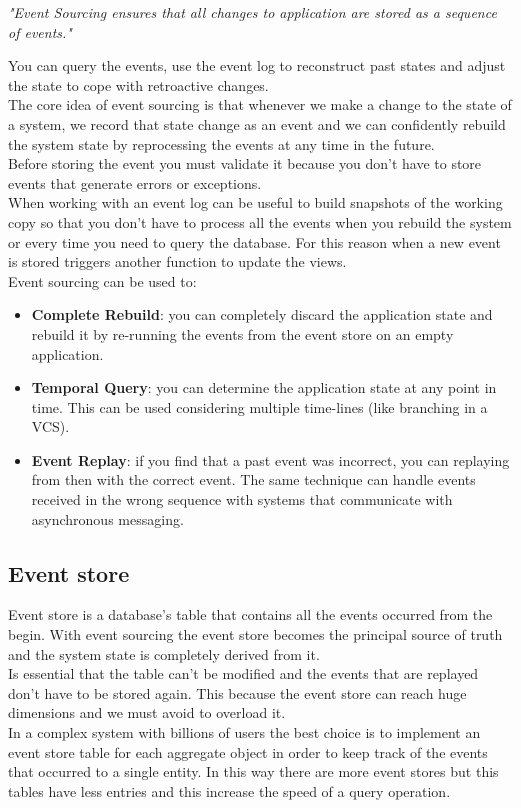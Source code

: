 \newpage
{}
\begin{center}
	\emph{"Event Sourcing ensures that all changes to application are stored as a sequence of events."} \\
\end{center}

You can query the events, use the event log to reconstruct past states and adjust the state to cope with retroactive changes.\\
The core idea of event sourcing is that whenever we make a change to the state of a system, we record that state change as an event and we can confidently rebuild the system state by reprocessing the events at any time in the future.\\
Before storing the event you must validate it because you don't have to store events that generate errors or exceptions.\\ 
When working with an event log can be useful to build snapshots of the working copy so that you don't have to process all the events when you rebuild the system or every time you need to query the database. For this reason when a new event is stored triggers another function to update the views.\\
Event sourcing can be used to:
\begin{itemize}
	\item \textbf{Complete Rebuild}: you can completely discard the application state  and rebuild it by re-running the events from the event store on an empty application.
	\item \textbf{Temporal Query}: you can determine the application state at any point in time. This can be used considering multiple time-lines (like branching in a VCS).
	\item \textbf{Event Replay}: if you find that a past event was incorrect, you can replaying from then with the correct event. The same technique can handle events received in the wrong sequence with systems that communicate with asynchronous messaging.
	
\end{itemize}

\subsection{Event store}
Event store is a database's table that contains all the events occurred from the begin.
With event sourcing the event store becomes the principal source of truth and the system state is completely derived from it. \\
Is essential that the table can't be modified and the events that are replayed don't have to be stored again. 
This because the event store can reach huge dimensions and we must avoid to overload it.\\
In a complex system with billions of users the best choice is to implement an event store table for each aggregate object in order to keep track of the events that occurred to a single entity. In this way there are more event stores but this tables have less entries and this increase the speed of a query operation.

